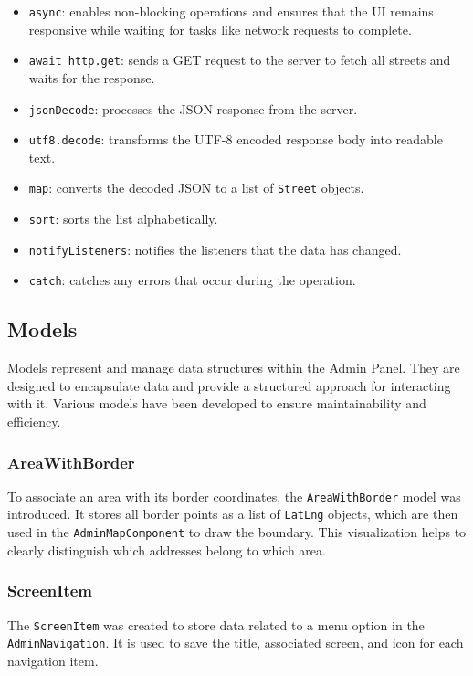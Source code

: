 \begin{itemize}
    \item \texttt{async}: enables non-blocking operations and ensures that the UI remains responsive while waiting for tasks like network requests to complete.
    \item \texttt{await http.get}: sends a GET request to the server to fetch all streets and waits for the response.
    \item \texttt{jsonDecode}: processes the JSON response from the server.
    \item \texttt{utf8.decode}: transforms the UTF-8 encoded response body into readable text.
    \item \texttt{map}: converts the decoded JSON to a list of \texttt{Street} objects.
    \item \texttt{sort}: sorts the list alphabetically.
    \item \texttt{notifyListeners}: notifies the listeners that the data has changed.
    \item \texttt{catch}: catches any errors that occur during the operation.
\end{itemize}

\subsection{Models}
Models represent and manage data structures within the Admin Panel. They are designed to encapsulate data and provide a structured approach for interacting with it. Various models have been developed to ensure maintainability and efficiency.



\subsubsection{AreaWithBorder}
To associate an area with its border coordinates, the \texttt{AreaWithBorder} model was introduced. It stores all border points as a list of \texttt{LatLng} objects, which are then used in the \texttt{AdminMapComponent} to draw the boundary. This visualization helps to clearly distinguish which addresses belong to which area.


\subsubsection{ScreenItem}
\label{fig:ScreenItem}
The \texttt{ScreenItem} was created to store data related to a menu option in the \texttt{AdminNavigation}. It is used to save the title, associated screen, and icon for each navigation item.

